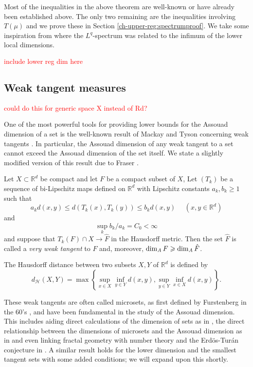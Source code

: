 Most of the inequalities in the above theorem are well-known or have already been established above.  The only two remaining are the inequalities involving $T(\mu)$ and we prove these in Section \ref{ch-upper-reg:spectrumproof}. We take some inspiration from \cite{fraser-jordan} where the $L^q$-spectrum was related to the infimum of the lower local dimensions.

\textcolor{red}{include lower reg dim here}


\subsection{Weak tangent measures}

\textcolor{red}{could do this for generic space X instead of Rd?}

One of the most powerful tools for providing lower bounds for the Assouad dimension of a set is the well-known result of Mackay and Tyson concerning weak tangents \cite[Proposition 6.1.5]{mackaytyson}. In particular, the Assouad dimension of any weak tangent to a set cannot exceed the Assouad dimension of the set itself. We state a slightly modified version of this result due to Fraser \cite[Proposition 7.7]{fraser}. 
\begin{proposition}\label{ch-upper-reg:tangents}
Let $X\subset \mathbb{R}^d$ be compact and let $F$ be a compact subset of $X$, Let $(T_k)$ be a sequence of bi-Lipschitz maps defined on $\mathbb{R}^d$ with Lipschitz constants $a_k, b_k \ge 1$ such that 
\[
a_k d(x,y) \leq d( T_k(x) , T_k(y) ) \leq b_k d( x, y)  \,\,\,\,\,\,\,\, (x,y\in\mathbb{R}^d)
\]
and
\[
\sup_k b_k / a_k = C_0 <\infty
\]
and suppose that $T_k(F) \cap X \rightarrow \hat{F}$ in the Hausdorff metric. Then the set $\hat F$ is called a \emph{very weak tangent} to $F$ and, moreover,  $\dim_{\text{\emph{A}}} F \geq \dim_{\text{\emph{A}}} \hat{F}$.
\end{proposition}
The Hausdorff distance between two subsets $X,Y$ of $\mathbb{R}^d$ is defined by
\[
d_{\mathcal{H}}(X,Y) = \max\left\{\sup_{x\in X} \inf_{y \in Y} d(x,y), \sup_{y\in Y} \inf_{x \in X} d(x,y)\right\}.
\]


These weak tangents are often called microsets, as first defined by Furstenberg in the 60's \cite{furstenberg08}, and have been fundamental in the study of the Assouad dimension. This includes aiding direct calculations of the dimension of sets as in \cite{either fraser-howroyd or other}, the direct relationship between the dimensions of microsets and the Assouad dimension as in \cite{fraser something, kaenmaki et al, fraser-howroyd-kaenmaki-yu} and even linking fractal geometry with number theory and the Erd\"os-Tur\'an conjecture in \cite{fraser-yu}. A similar result holds for the lower dimension and the smallest tangent sets with some added conditions; we will expand upon this shortly.



